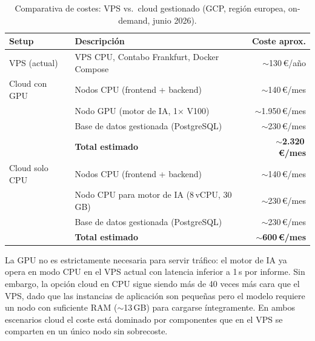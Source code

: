 \begin{table}[h]
\centering
\caption{Comparativa de costes: VPS vs.\ cloud gestionado (GCP, región europea, on-demand, junio 2026).}
\label{tab:vps-vs-cloud}
\begin{tabular}{llr}
\hline
\textbf{Setup} & \textbf{Descripción} & \textbf{Coste aprox.} \\
\hline
VPS (actual)          & VPS CPU, Contabo Frankfurt, Docker Compose    & $\sim$130\,€/año \\
\hline
Cloud con GPU\footnotemark[1]
                      & Nodos CPU (frontend + backend)                & $\sim$140\,€/mes \\
                      & Nodo GPU (motor de IA, 1$\times$ V100)\footnotemark[2] & $\sim$1.950\,€/mes \\
                      & Base de datos gestionada (PostgreSQL)\footnotemark[3] & $\sim$230\,€/mes \\
                      & \textbf{Total estimado}                       & \textbf{$\sim$2.320\,€/mes} \\
\hline
Cloud solo CPU        & Nodos CPU (frontend + backend)                & $\sim$140\,€/mes \\
                      & Nodo CPU para motor de IA (8\,vCPU, 30\,GB)\footnotemark[4] & $\sim$230\,€/mes \\
                      & Base de datos gestionada (PostgreSQL)\footnotemark[3] & $\sim$230\,€/mes \\
                      & \textbf{Total estimado}                       & \textbf{$\sim$600\,€/mes} \\
\hline
\end{tabular}
\end{table}

La GPU no es estrictamente necesaria para servir tráfico: el motor de IA ya opera en modo CPU en el VPS actual con latencia inferior a 1\,s por informe. Sin embargo, la opción cloud en CPU sigue siendo más de 40 veces más cara que el VPS, dado que las instancias de aplicación son pequeñas pero el modelo requiere un nodo con suficiente RAM ($\sim$13\,GB) para cargarse íntegramente. En ambos escenarios cloud el coste está dominado por componentes que en el VPS se comparten en un único nodo sin sobrecoste.
